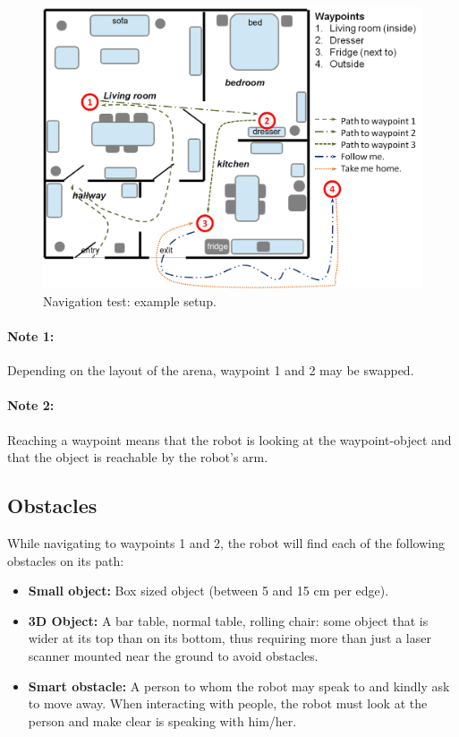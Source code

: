 \begin{figure}[tbp]
	\centering
	\includegraphics[width=0.5\columnwidth]{images/navigation.png}
	\caption{Navigation test: example setup.}
	\label{fig:restaurant}
\end{figure}

\paragraph*{Note 1:} Depending on the layout of the arena, waypoint 1 and 2 may be swapped.
\paragraph*{Note 2:} Reaching a waypoint means that the robot is looking at the waypoint-object and that the object is reachable by the robot's arm. 

\subsection{Obstacles}
While navigating to waypoints 1 and 2, the robot will find each of the following obstacles on its path:
\begin{itemize}
		\item \textbf{Small object:} Box sized object (between 5 and 15 cm per edge).  
		\item \textbf{3D Object:} A bar table, normal table, rolling chair: some object that is wider at its top than on its bottom, 
		  thus requiring more than just a laser scanner mounted near the ground to avoid obstacles.
		\item \textbf{Smart obstacle:} A person to whom the robot may speak to and kindly ask to move away. 
		  When interacting with people, the robot must look at the person and make clear is speaking with him/her.
	\end{itemize}

